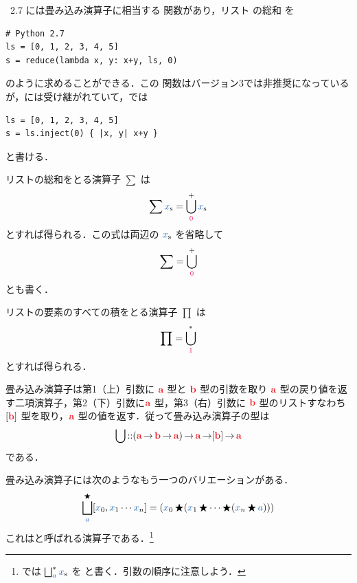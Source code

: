 \documentclass[a5paper,twoside,fleqn,draft]{jsbook}
\begin{document}
\python\ 2.7 には畳み込み演算子に相当する  関数があり，リスト  の総和  を
\begin{pythoncode}
\begin{verbatim}
# Python 2.7
ls = [0, 1, 2, 3, 4, 5]
s = reduce(lambda x, y: x+y, ls, 0)
\end{verbatim}
\end{pythoncode}
のように求めることができる．この  関数は\python バージョン3では非推奨になっているが，\ruby には受け継がれていて，\ruby では
\begin{rubycode}
\begin{verbatim}
ls = [0, 1, 2, 3, 4, 5]
s = ls.inject(0) { |x, y| x+y }
\end{verbatim}
\end{rubycode}
と書ける．

リストの総和をとる演算子 $\sum$ は
\begin{equation}
  \sum\hListVar{x}
  =\mFold^+_{\hConstant{0}}\hListVar{x}
\end{equation}
とすれば得られる．この式は両辺の $\hListVar{x}$ を省略して
\begin{equation}
  \sum
  =\mFold^+_{\hConstant{0}}
\end{equation}
とも書く．

リストの要素のすべての積をとる演算子 $\prod$ は
\begin{equation}
  \prod
  =\mFold^*_{\hConstant{1}}
\end{equation}
とすれば得られる．

畳み込み演算子は第1（上）引数に $\hTypeName{a}$ 型と $\hTypeName{b}$ 型の引数を取り $\hTypeName{a}$ 型の戻り値を返す二項演算子，第2（下）引数に$\hTypeName{a}$ 型，第3（右）引数に $\hTypeName{b}$ 型のリストすなわち$[\hTypeName{b}]$ 型を取り，$\hTypeName{a}$ 型の値を返す．従って畳み込み演算子の型は
\begin{equation}
  \mFold
  \hIsTypeOf(\hTypeName{a}\hFunctionArrow\hTypeName{b}\hFunctionArrow\hTypeName{a})
  \hFunctionArrow\hTypeName{a}
  \hFunctionArrow[\hTypeName{b}]
  \hFunctionArrow\hTypeName{a}
\end{equation}
である．

\separator

畳み込み演算子には次のようなもう一つのバリエーションがある．
\begin{equation}
  \mFoldRight^{\hAnyBinOp}_{\hVar{a}}[\hVar{x}_0,\hVar{x}_1\dotsb \hVar{x}_n]
  =(\hVar{x}_0\hAnyBinOp(\hVar{x}_1\hAnyBinOp\dotsb\hAnyBinOp(\hVar{x}_n\hAnyBinOp\hVar{a})))
\end{equation}
これはと呼ばれる演算子である．\footnote{\haskell では $\mFoldRight^{*}_{\hVar{a}}\hListVar{x}$ を  と書く．引数の順序に注意しよう．}
\end{document}
